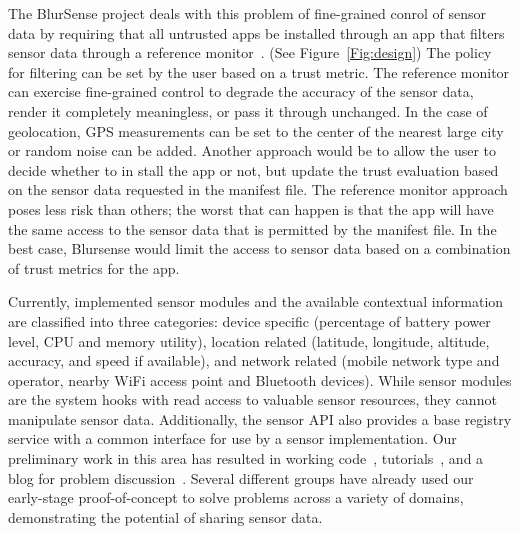 The BlurSense project deals with this problem of fine-grained conrol of sensor data
by requiring that all untrusted apps be installed
through an app that filters sensor data through a reference monitor~\cite{cappos2014blursense}.  
(See Figure~\ref{Fig:design})
The policy for filtering can be set by the user based on a trust metric.
 The reference
monitor can exercise fine-grained control to degrade the accuracy of the sensor data, render it 
completely meaningless, or pass it through unchanged.  
In the case of geolocation, GPS measurements can be set to the center of the nearest
large city or random noise can be added.  Another approach would be to allow the user to decide
whether to in stall the app or not, but update the trust evaluation based on the sensor 
data requested in the manifest file.
The reference monitor approach poses less risk than others; the worst that can happen is
that the app will have the same access to the sensor data that
is permitted by the manifest file. In the best case, Blursense
would limit the access to sensor data based on a combination of trust metrics for the app.

Currently, implemented sensor modules and
the available contextual information are classified into three
categories: device specific (percentage of battery power level,
CPU and memory utility), location related (latitude, longitude,
altitude, accuracy, and speed if available), and network related
(mobile network type and operator, nearby WiFi access point
and Bluetooth devices). While sensor modules are the system
hooks with read access to valuable sensor resources, they
cannot manipulate sensor data. Additionally, the sensor API
also provides a base registry service with a common interface
for use by a sensor implementation. 
Our preliminary work in this area has resulted in working 
code~\cite{seattle-sensor-git}, tutorials~\cite{seattle-sensor-project}, and a 
blog for problem discussion~\cite{sensor}. Several different groups have
already used our early-stage proof-of-concept to solve problems across a variety
of domains, demonstrating the potential of sharing sensor data. 

